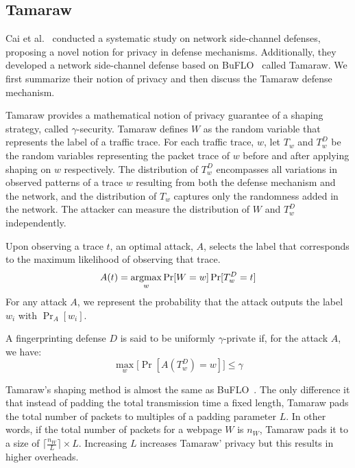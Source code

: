 \subsection{Tamaraw}\label{subsubsec:tamaraw}
Cai et al.~\cite{cai2014systematic} conducted a systematic study on network side-channel defenses, proposing a novel notion for privacy in defense mechanisms.
Additionally, they developed a network side-channel defense based on BuFLO~\cite{dyer2012peek} called Tamaraw. 
We first summarize their notion of privacy and then discuss the Tamaraw defense mechanism.


Tamaraw \cite{cai2014tamaraw} provides a
mathematical notion of privacy guarantee of a shaping strategy, called $\gamma$-security.
Tamaraw defines $W$ as the random variable that represents the label of a
traffic trace.
For each traffic trace, $w$, let $T_{w}$ and $T_{w}^{D}$ be the random variables representing
the packet trace of $w$ before and after applying shaping on $w$ respectively.
The distribution of $T_{w}^D$ encompasses all variations in observed
patterns of a trace $w$ resulting from both the defense mechanism and the
network, and the distribution of $T_{w}$ captures only the randomness added in the network.
The attacker can measure the distribution of $W$ and $T_{w}^{D}$ independently.

Upon observing a trace $t$, an optimal attack, $A$, selects the
label that corresponds to the maximum likelihood of observing that trace.
\begin{equation*}
  A(t) = \operatorname*{argmax}_{w}{\Pr[W=w]\Pr[T_{w}^{D}=t]}
\end{equation*}
For any attack $A$, we represent the probability that the attack outputs the label $w_i$ with $\Pr_A[w_i]$.
\begin{definition}
  A fingerprinting defense $D$ is said to be uniformly $\gamma$-private if, for the attack ${A}$, we have:
  \begin{equation*}
    \max_w\big[\Pr[A(T_w^D)=w]\big] \leq \gamma
  \end{equation*}
\end{definition}

Tamaraw's shaping method is almost the same as BuFLO~\cite{dyer2012peek}. The only difference it that instead of padding the total transmission time a fixed length, Tamaraw pads the total number of packets to multiples of a padding parameter $L$.
In other words, if the total number of packets for a webpage $W$ is $n_W$, Tamaraw pads it to a size of $\lceil \frac{n_W}{L} \rceil \times L$.
Increasing $L$ increases Tamaraw' privacy but this results in higher overheads.


